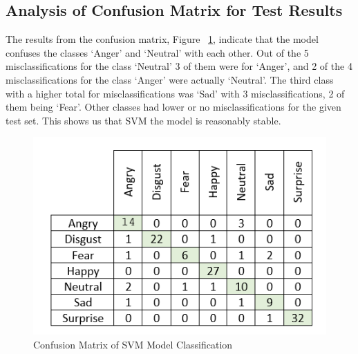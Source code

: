\begin{table}[H]
\centering
{}
\caption{SVM Classification Report}
\label{table:class}
\end{table}


\subsection{Analysis of Confusion Matrix for Test Results}
The results from the confusion matrix, Figure ~\ref{fig:confu}, indicate that the model confuses the classes `Anger' and `Neutral' with each other. Out of the 5 misclassifications for the class `Neutral' 3 of them were for `Anger', and  2 of the 4 misclassifications for the class `Anger' were actually `Neutral'. The third class with a higher total for misclassifications was `Sad' with 3 misclassifications, 2 of them being `Fear'. Other classes had lower or no misclassifications for the given test set. This shows us that SVM the model is reasonably stable. 
\begin{figure}[H]
  \centering
  \includegraphics[scale=1.5]{conf1}
  \caption{Confusion Matrix of SVM Model Classification}
  \label{fig:confu}
\end{figure} 


